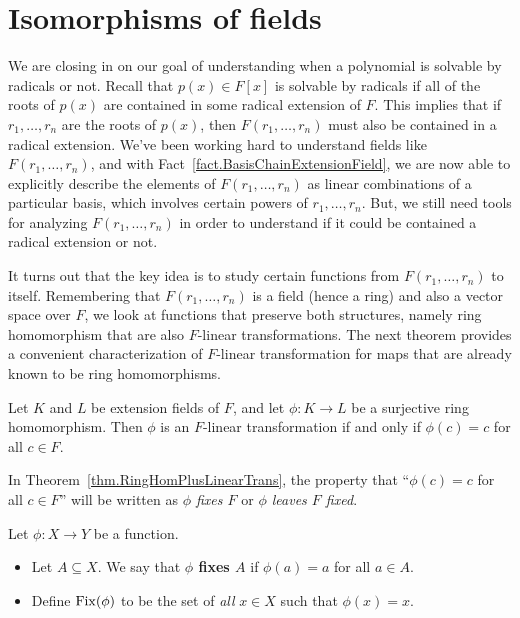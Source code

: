 \section{Isomorphisms of fields}

We are closing in on our goal of understanding when a polynomial is solvable by radicals or not. Recall that $p(x)\in F[x]$ is solvable by radicals if all of the roots of $p(x)$ are contained in some radical extension of $F$. This implies that if $r_1,\ldots,r_n$ are the roots of $p(x)$, then  $F(r_1,\ldots,r_n)$ must also be contained in a radical extension. We've been working hard to understand fields like $F(r_1,\ldots,r_n)$, and with Fact~\ref{fact.BasisChainExtensionField}, we are now able to explicitly describe the elements of $F(r_1,\ldots,r_n)$ as linear combinations of a particular basis, which involves certain powers of $r_1,\ldots,r_n$. But, we still need tools for analyzing $F(r_1,\ldots,r_n)$ in order to understand if it could be contained a radical extension or not. 

It turns out that the key idea is to study certain functions from $F(r_1,\ldots,r_n)$ to itself. Remembering that $F(r_1,\ldots,r_n)$ is a field (hence a ring) and also a vector space over $F$, we look at functions that preserve both structures, namely ring homomorphism that are also $F$-linear transformations. The next theorem provides a convenient characterization of $F$-linear transformation for maps that are already known to be ring homomorphisms.  
 
\begin{theorem}\label{thm.RingHomPlusLinearTrans}
Let $K$ and $L$ be extension fields of $F$, and let $\phi:K\to L$ be a surjective ring homomorphism. Then $\phi$ is an $F$-linear transformation if and only if $\phi(c) = c$ for all $c\in F$.
\end{theorem}

In Theorem~\ref{thm.RingHomPlusLinearTrans}, the property that ``$\phi(c) = c$ for all $c\in F$'' will be written as \emph{$\phi$ fixes $F$} or \emph{$\phi$ leaves  $F$ fixed}.

\begin{definition}
Let $\phi:X\to Y$ be a function.  
\begin{itemize}
\item Let $A \subseteq X$. We say that \textbf{$\phi$ fixes $A$} if $\phi(a) = a$ for all $a\in A$. 
\item Define $\operatorname{Fix}(\phi)$ to be the set of \emph{all} $x\in X$ such that $\phi(x) = x$.
\end{itemize}
\end{definition}


